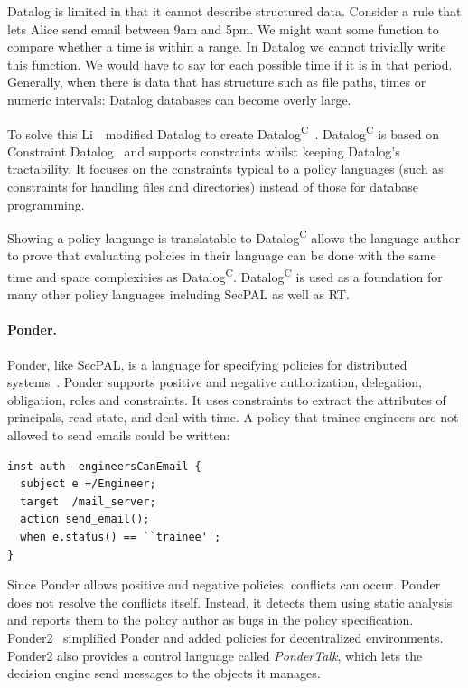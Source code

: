 \documentclass[thesis.tex]{subfiles}
\begin{document}
Datalog is limited in that it cannot describe structured data. Consider a rule
that lets Alice send email between 9am and 5pm. We might want some function to
compare whether a time is within a range. In Datalog we cannot trivially write
this function. We would have to say for each possible time if it is in that
period. Generally, when there is data that has structure such as file paths,
times or numeric intervals: Datalog databases can become overly large.

To solve this Li~\etal{}~modified Datalog to create
Datalog\textsuperscript{C}~\cite{li_datalog_2003}. Datalog\textsuperscript{C}
is based on Constraint
Datalog~\cite{revesz_constraint_1995,revesz_safe_1998} and supports
constraints whilst keeping Datalog's tractability. It focuses on the
constraints typical to a policy languages (such as constraints for
handling files and directories) instead of those for database
programming.

Showing a policy language is translatable to Datalog\textsuperscript{C} allows
the language author to prove that evaluating policies in their language can be
done with the same time and space complexities as Datalog\textsuperscript{C}.
Datalog\textsuperscript{C} is used as a foundation for many other policy
languages including SecPAL as well as RT.

\paragraph*{Ponder.}
Ponder, like SecPAL, is a language for specifying policies for distributed
systems~\cite{damianou_ponder_2001}. Ponder supports positive and negative
authorization, delegation, obligation, roles and constraints. It uses
constraints to extract the attributes of principals, read state, and deal with
time. A policy that trainee engineers are not allowed to send emails could be
written:

\begin{lstlisting}
inst auth- engineersCanEmail {
  subject e =/Engineer;
  target  /mail_server;
  action send_email();
  when e.status() == ``trainee'';
}
\end{lstlisting}

Since Ponder allows positive and negative policies, conflicts can occur. Ponder
does not resolve the conflicts itself. Instead, it detects them using static
analysis and reports them to the policy author as bugs in the policy
specification. Ponder2~\cite{twidle_ponder2:_2009} simplified Ponder and added
policies for decentralized environments. Ponder2 also provides a control
language called \emph{PonderTalk}, which lets the decision engine send messages
to the objects it manages.
\end{document}
